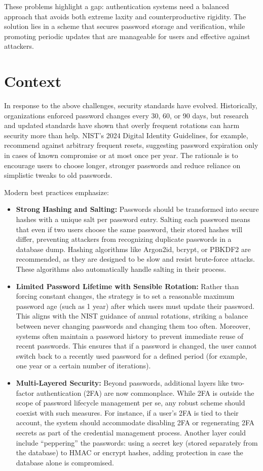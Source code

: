 \documentclass[11pt]{article}
\begin{document}
These problems highlight a gap: authentication systems need a balanced approach that avoids both extreme laxity and counterproductive rigidity. The solution lies in a scheme that secures password storage and verification, while promoting periodic updates that are manageable for users and effective against attackers.

\section{Context}
In response to the above challenges, security standards have evolved. Historically, organizations enforced password changes every 30, 60, or 90 days, but research and updated standards have shown that overly frequent rotations can harm security more than help. NIST’s 2024 Digital Identity Guidelines, for example, recommend against arbitrary frequent resets, suggesting password expiration only in cases of known compromise or at most once per year. The rationale is to encourage users to choose longer, stronger passwords and reduce reliance on simplistic tweaks to old passwords. 

Modern best practices emphasize:
\begin{itemize}
    \item \textbf{Strong Hashing and Salting:} Passwords should be transformed into secure hashes with a unique salt per password entry. Salting each password means that even if two users choose the same password, their stored hashes will differ, preventing attackers from recognizing duplicate passwords in a database dump. Hashing algorithms like Argon2id, bcrypt, or PBKDF2 are recommended, as they are designed to be slow and resist brute-force attacks. These algorithms also automatically handle salting in their process.
    \item \textbf{Limited Password Lifetime with Sensible Rotation:} Rather than forcing constant changes, the strategy is to set a reasonable maximum password age (such as 1 year) after which users must update their password. This aligns with the NIST guidance of annual rotations, striking a balance between never changing passwords and changing them too often. Moreover, systems often maintain a password history to prevent immediate reuse of recent passwords. This ensures that if a password is changed, the user cannot switch back to a recently used password for a defined period (for example, one year or a certain number of iterations).
    \item \textbf{Multi-Layered Security:} Beyond passwords, additional layers like two-factor authentication (2FA) are now commonplace. While 2FA is outside the scope of password lifecycle management per se, any robust scheme should coexist with such measures. For instance, if a user’s 2FA is tied to their account, the system should accommodate disabling 2FA or regenerating 2FA secrets as part of the credential management process. Another layer could include ``peppering'' the passwords: using a secret key (stored separately from the database) to HMAC or encrypt hashes, adding protection in case the database alone is compromised.
\end{itemize}
\end{document}
